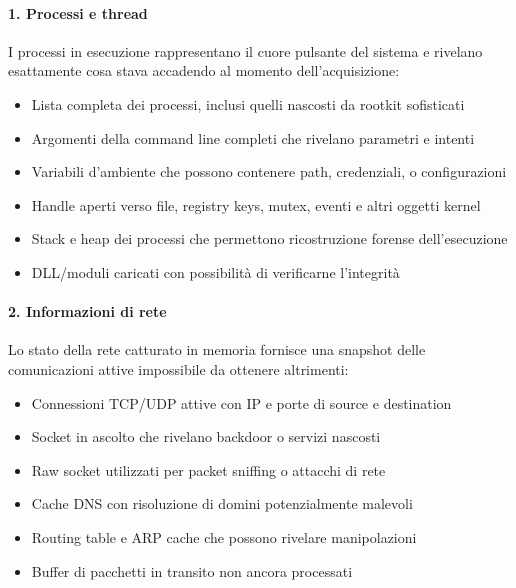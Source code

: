 \paragraph{1. Processi e thread}
I processi in esecuzione rappresentano il cuore pulsante del sistema e rivelano esattamente cosa stava accadendo al momento dell'acquisizione:
\begin{itemize}
    \item Lista completa dei processi, inclusi quelli nascosti da rootkit sofisticati
    \item Argomenti della command line completi che rivelano parametri e intenti
    \item Variabili d'ambiente che possono contenere path, credenziali, o configurazioni
    \item Handle aperti verso file, registry keys, mutex, eventi e altri oggetti kernel
    \item Stack e heap dei processi che permettono ricostruzione forense dell'esecuzione
    \item DLL/moduli caricati con possibilità di verificarne l'integrità
\end{itemize}

\paragraph{2. Informazioni di rete}
Lo stato della rete catturato in memoria fornisce una snapshot delle comunicazioni attive impossibile da ottenere altrimenti:
\begin{itemize}
    \item Connessioni TCP/UDP attive con IP e porte di source e destination
    \item Socket in ascolto che rivelano backdoor o servizi nascosti
    \item Raw socket utilizzati per packet sniffing o attacchi di rete
    \item Cache DNS con risoluzione di domini potenzialmente malevoli
    \item Routing table e ARP cache che possono rivelare manipolazioni
    \item Buffer di pacchetti in transito non ancora processati
\end{itemize}

